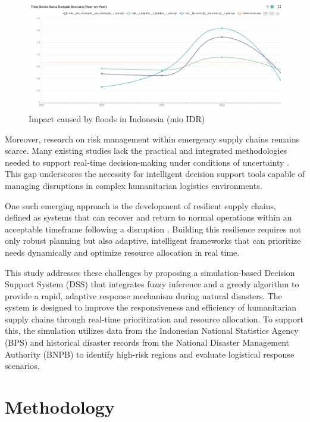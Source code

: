 \documentclass[journal,final,a4paper,twoside,11pt]{IEEEtran}
\begin{document}
\begin{figure}[htbp]
    \centerline{\includegraphics[width=0.8\linewidth]{fig3.png}}
    \caption{Impact caused by floods in Indonesia (mio IDR)}
    \label{fig:floodimpact}
\end{figure}

{}
\newline

Moreover, research on risk management within emergency supply chains remains scarce. Many existing studies lack the practical and integrated methodologies needed to support real-time decision-making under conditions of uncertainty \cite{chukwuka2023comprehensive}. This gap underscores the necessity for intelligent decision support tools capable of managing disruptions in complex humanitarian logistics environments.

One such emerging approach is the development of resilient supply chains, defined as systems that can recover and return to normal operations within an acceptable timeframe following a disruption \cite{orengo2022food}. Building this resilience requires not only robust planning but also adaptive, intelligent frameworks that can prioritize needs dynamically and optimize resource allocation in real time.

This study addresses these challenges by proposing a simulation-based Decision Support System (DSS) that integrates fuzzy inference and a greedy algorithm to provide a rapid, adaptive response mechanism during natural disasters. The system is designed to improve the responsiveness and efficiency of humanitarian supply chains through real-time prioritization and resource allocation. To support this, the simulation utilizes data from the Indonesian National Statistics Agency (BPS) and historical disaster records from the National Disaster Management Authority (BNPB) to identify high-risk regions and evaluate logistical response scenarios.



\section{Methodology}
\end{document}
